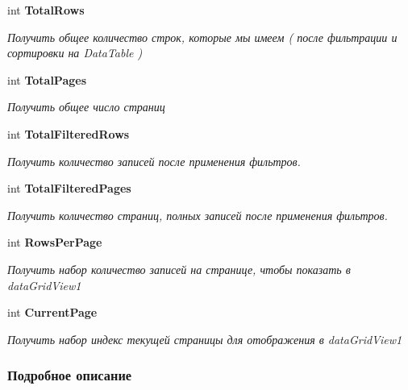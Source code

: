 \begin{DoxyCompactItemize}
\item 
int {\bf Total\+Rows}\hspace{0.3cm}{\ttfamily  [get]}
\begin{DoxyCompactList}\small\item\em Получить общее количество строк, которые мы имеем ( после фильтрации и сортировки на Data\+Table ) \end{DoxyCompactList}\item 
int {\bf Total\+Pages}\hspace{0.3cm}{\ttfamily  [get]}
\begin{DoxyCompactList}\small\item\em Получить общее число страниц \end{DoxyCompactList}\item 
int {\bf Total\+Filtered\+Rows}\hspace{0.3cm}{\ttfamily  [get]}
\begin{DoxyCompactList}\small\item\em Получить количество записей после применения фильтров. \end{DoxyCompactList}\item 
int {\bf Total\+Filtered\+Pages}\hspace{0.3cm}{\ttfamily  [get]}
\begin{DoxyCompactList}\small\item\em Получить количество страниц, полных записей после применения фильтров. \end{DoxyCompactList}\item 
int {\bf Rows\+Per\+Page}\hspace{0.3cm}{\ttfamily  [get]}
\begin{DoxyCompactList}\small\item\em Получить набор количество записей на странице, чтобы показать в data\+Grid\+View1 \end{DoxyCompactList}\item 
int {\bf Current\+Page}\hspace{0.3cm}{\ttfamily  [get]}
\begin{DoxyCompactList}\small\item\em Получить набор индекс текущей страницы для отображения в data\+Grid\+View1 \end{DoxyCompactList}\end{DoxyCompactItemize}


\subsubsection{Подробное описание}



